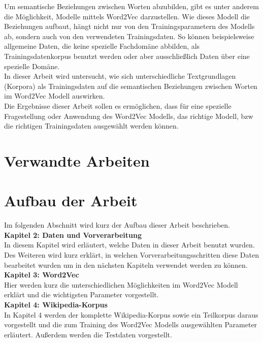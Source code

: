 \documentclass[12pt,a4paper]{report}
\begin{document}
	
	Um semantische Beziehungen zwischen Worten abzubilden, gibt es unter anderem die Möglichkeit, Modelle mittels Word2Vec darzustellen. Wie dieses Modell die Beziehungen aufbaut, hängt nicht nur von den Trainingsparametern des Modells ab, sondern auch von den verwendeten Trainingsdaten. So können beispielsweise allgemeine Daten, die keine spezielle Fachdomäne abbilden, als Trainingsdatenkorpus benutzt werden oder aber ausschließlich Daten über eine spezielle Domäne. \\		
	In dieser Arbeit wird untersucht, wie sich unterschiedliche Textgrundlagen (Korpora) als Trainingsdaten auf die semantischen Beziehungen zwischen Worten im Word2Vec Modell auswirken. \\
	Die Ergebnisse dieser Arbeit sollen es ermöglichen, dass für eine spezielle Fragestellung oder Anwendung des Word2Vec Modells, das richtige Modell, bzw die richtigen Trainingsdaten ausgewählt werden können.\\
	


	\section{Verwandte Arbeiten}
	
	
	
	
	\newpage
	\section{Aufbau der Arbeit}
	Im folgenden Abschnitt wird kurz der Aufbau dieser Arbeit beschrieben.\\
	
	\textbf{Kapitel 2: Daten und Vorverarbeitung}\\
	In diesem Kapitel wird erläutert, welche Daten in dieser Arbeit benutzt wurden. Des Weiteren wird kurz erklärt, in welchen Vorverarbeitungsschritten diese Daten bearbeitet wurden um in den nächsten Kapiteln verwendet werden zu können.\\
	
	\textbf{Kapitel 3: Word2Vec}\\
	Hier werden kurz die unterschiedlichen Möglichkeiten im Word2Vec Modell erklärt und die wichtigsten Parameter vorgestellt.\\
	
	\textbf{Kapitel 4: Wikipedia-Korpus}\\
	In Kapitel 4 werden der komplette Wikipedia-Korpus sowie ein Teilkorpus daraus vorgestellt und die zum Training des Word2Vec Modells ausgewählten Parameter erläutert. Außerdem werden die Testdaten vorgestellt.\\
	
\end{document}
